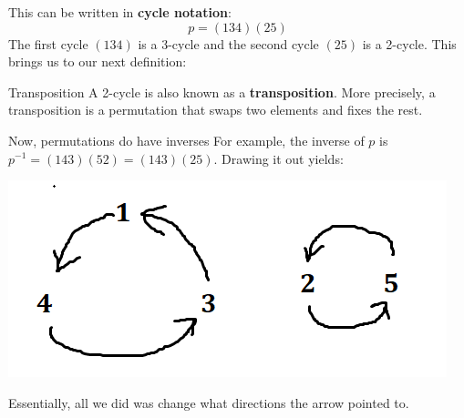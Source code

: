 \documentclass[letterpaper]{article}
\begin{document}
This can be written in \textbf{cycle notation}:
\[p = (1 3 4)(2 5)\]
The first cycle $(1 3 4)$ is a 3-cycle and the second cycle $(2 5)$ is a 2-cycle. This brings us to our next definition: 
\begin{definition}{Transposition}{}
    A 2-cycle is also known as a \textbf{transposition}. More precisely, a transposition is a permutation that swaps two elements and fixes the rest.
\end{definition}

Now, permutations do have inverses For example, the inverse of $p$ is $p^{-1} = (1 4 3) (5 2) = (1 4 3) (2 5)$. Drawing it out yields: 
\begin{center}
    \includegraphics[scale=0.7]{assets/permutation_134_25_i.png}
\end{center}
Essentially, all we did was change what directions the arrow pointed to.
\end{document}
